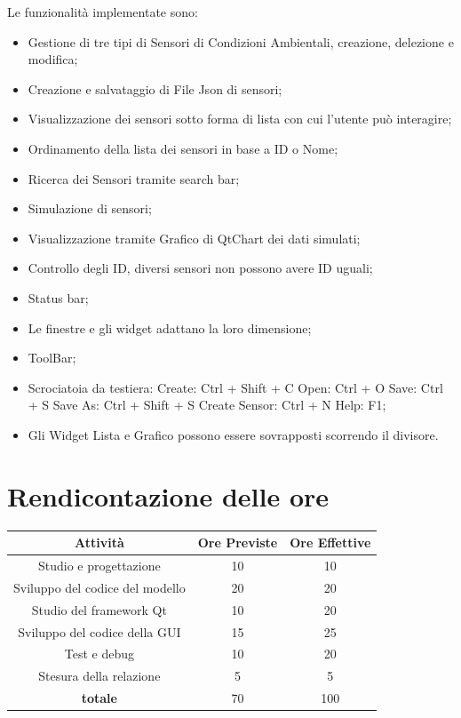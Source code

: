 \documentclass{article}
\begin{document}
Le funzionalità implementate sono:
\begin{itemize}
    \item Gestione di tre tipi di Sensori di Condizioni Ambientali, creazione, delezione e modifica;
    \item Creazione e salvataggio di File Json di sensori;
    \item Visualizzazione dei sensori sotto forma di lista con cui l'utente può interagire;
    \item Ordinamento della lista dei sensori in base a ID o Nome;
    \item Ricerca dei Sensori tramite search bar; 
    \item Simulazione di sensori;
    \item Visualizzazione tramite Grafico di QtChart dei dati simulati;
    \item Controllo degli ID, diversi sensori non possono avere ID uguali;
    \item Status bar; 
    \item Le finestre e gli widget adattano la loro dimensione;  
    \item ToolBar;
    \item Scrociatoia da testiera: Create: Ctrl + Shift + C
Open: Ctrl + O
Save: Ctrl + S
Save As: Ctrl + Shift + S
Create Sensor: Ctrl + N
Help: F1;
    \item Gli Widget Lista e Grafico possono essere sovrapposti scorrendo il divisore.
\end{itemize}

\section{Rendicontazione delle ore}

\begin{table}[h!]
\centering
\begin{tabular}{|c|c|c|}
\hline
\textbf{Attività} & \textbf{Ore Previste} & \textbf{Ore Effettive} \\
\hline
Studio e progettazione & 10 & 10 \\
\hline
Sviluppo del codice del modello & 20 & 20 \\
\hline
Studio del framework Qt & 10 & 20 \\
\hline
Sviluppo del codice della GUI & 15 & 25 \\
\hline
Test e debug & 10 & 20 \\
\hline
Stesura della relazione & 5 & 5 \\
\hline
\textbf{totale} & 70 & 100 \\
\hline
\end{tabular}
\end{table}
\end{document}

